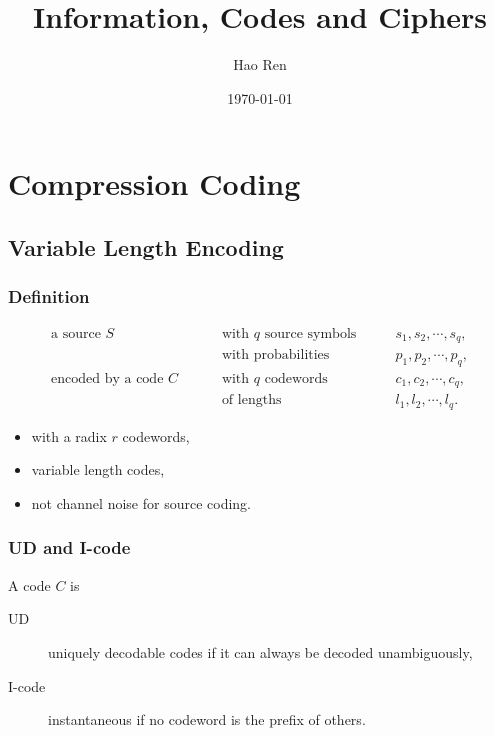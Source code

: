\documentclass{article}
\begin{document}
\title{Information, Codes and Ciphers}
\author{Hao Ren}
\date{\today}
\maketitle

\setcounter{section}{2}

\newpage

\section{Compression Coding}

\subsection{Variable Length Encoding}

\subsubsection{Definition}

\begin{align*}
	\text{a source } S \qquad &\text{ with } q \text{ source symbols} \qquad & s_{1},s_{2},\cdots,s_{q},\\
	&\text{ with probabilities} \qquad &  p_{1},p_{2},\cdots,p_{q},\\
	\text{encoded by a code } C \qquad &\text{ with } q \text{ codewords} \qquad & c_{1},c_{2},\cdots,c_{q},\\
	&\text{ of lengths} \qquad & l_{1},l_{2},\cdots,l_{q}.
\end{align*}

\begin{itemize}
	\item with a radix $r$ codewords,
	\item variable length codes,
	\item not channel noise for source coding.
\end{itemize}

\subsubsection{UD and I-code}

A code $C$ is

\begin{description}
	\item[UD] uniquely decodable codes if it can always be decoded unambiguously,
	\item[I-code] instantaneous if no codeword is the prefix of others.
\end{description}
\end{document}
